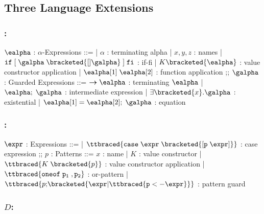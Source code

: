 \documentclass[]{article}
\begin{document}
\subsection{Three Language Extensions}

\subsubsection{\VMinus:}

\begin{center}
    \begin{bnf}
    $\ealpha$ : \textsf{$\alpha$-Expressions} ::=
    | $\alpha$ : terminating alpha
    | $x, y, z$ : names
    | $\tt{if} \; \tt{[}\; \galpha \; \bracketed{[] \galpha} \;\tt{]} \; \tt{fi}$ : if-fi 
    | $K \bracketed{\ealpha}$ : value constructor application 
    | $\ealpha[1] \; \ealpha[2]$ : function application 
    ;;
    $\galpha$ : \textsf{Guarded Expressions} ::=  
    $\boldsymbol{\rightarrow}\ealpha$ : terminating $\ealpha$ 
    | $\ealpha; \; \galpha$ : intermediate expression 
    | $\exists \bracketed{x} \tt{.} \galpha$ : existential 
    | $\ealpha[1] = \ealpha[2]; \; \galpha$ : equation 
    \end{bnf}
\end{center}

\bigskip 

\subsubsection{\PPlus:}
\begin{center}
    \begin{bnf}
$\expr$ : \textsf{Expressions} ::=
    | $\ttbraced{\tt{case} \; \expr \; \bracketed{\tt{[} p \; \expr \tt{]}}}$ : case expression 
    ;;
    $p$ : \textsf{Patterns} ::= $x$ : name 
    | $K$ : value constructor 
    | $\ttbraced{K \; \bracketed{p}}$ : value constructor application 
    | $\ttbraced{\tt{oneof} \; p_{1} \;, p_{2} }$ : or-pattern 
    | $\ttbraced{p \tt{;} \bracketed{\expr \vert \ttbraced{p  <- \expr}}}$ : pattern guard
    \end{bnf}
\end{center}


\bigskip 

\subsubsection{$D$:}
\end{document}
